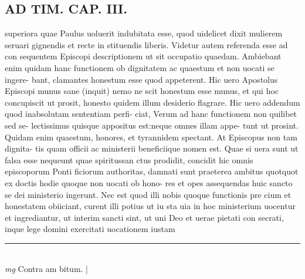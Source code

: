 \documentclass{article}
\begin{document}
\begin{pages}
\section*{AD TIM. CAP. III. }
\marginpar{[ p.123 ]}\pstart superiora quae Paulus uoluerit indubitata esse, quod uidelicet dixit mulierem seruari gignendis et recte in stituendis liberis. Videtur autem referenda esse ad con sequentem Episcopi descriptionem ut sit occupatio quaedam. Ambiebant enim quidam hanc functionem ob dignitatem ac quaestum et non uocati se ingere- bant, clamantes honestum esse quod appeterent. Hic uero Apostolus Episcopi munus sane (inquit) nemo ne scit honestum esse munus, et qui hoc concupiscit ut prosit, honesto quidem illum desiderio flagrare. Hic uero addendum quod inabsolutam sententiam perfi- ciat, Verum ad hanc functionem non quilibet sed se- lectissimus quisque appositus est:neque omnes illam appe- tunt ut prosint. Quidam enim quaestum, honores, et tyrannidem spectant. At Episcopus non tam dignita- tis quam officii ac ministerii beneficiique nomen est. Quae si uera sunt ut falsa esse nequeunt quae spiritussan ctus prodidit, concidit hic omnis episcoporum Ponti ficiorum authoritas, damnati sunt praeterea ambitus quotquot ex doctis hodie quoque non uocati ob hono- res et opes assequendas huic sancto se dei ministerio ingerunt. Nec est quod illi nobis quoque functionis pre cium et honestatem obiiciant, curent illi potius ut iu sta uia in hoc ministerium uocentur et ingrediantur, ut interim sancti sint, ut uni Deo et uerae pietati con secrati, inque lege domini exercitati uocationem iustam  \pend
\vspace{0.5cm}\noindent
\vspace{0.2cm}\rule{1cm}{0.2pt}\\ 
\hspace{0.2cm}\textit{mg}
\footnotesize Contra am bitum. 
\normalsize| 

\end{pages}
\end{document}
